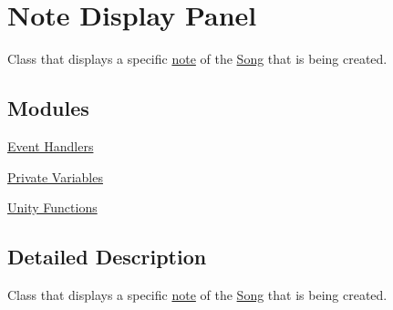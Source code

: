 \hypertarget{group___doc_s_c___n_d_p}{}\section{Note Display Panel}
\label{group___doc_s_c___n_d_p}


Class that displays a specific \hyperlink{group___music_structs_struct_music_1_1_combined_note}{note} of the \hyperlink{class_song}{Song} that is being created.  


\subsection*{Modules}
\begin{DoxyCompactItemize}
\item 
\hyperlink{group___s_c___n_d_p_handlers}{Event Handlers}
\item 
\hyperlink{group___s_c___n_d_p_priv_var}{Private Variables}
\item 
\hyperlink{group___s_c___n_d_p_unity}{Unity Functions}
\end{DoxyCompactItemize}


\subsection{Detailed Description}
Class that displays a specific \hyperlink{group___music_structs_struct_music_1_1_combined_note}{note} of the \hyperlink{class_song}{Song} that is being created. 

